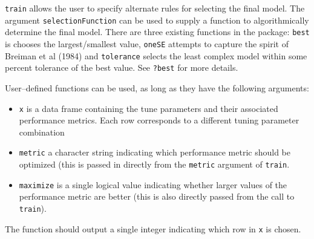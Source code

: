 \documentclass[12pt]{article}
\begin{document}
\texttt{train} allows the user to specify alternate rules for selecting the final model. The argument \texttt{selectionFunction}  can be used to supply a function to algorithmically determine the final model. There are three existing functions in the package: \texttt{best} is chooses the largest/smallest value, \texttt{oneSE} attempts to capture the spirit of Breiman et al (1984) and \texttt{tolerance} selects the least complex model within some percent tolerance of the best value. See \texttt{?best} for more details.

User--defined functions can be used, as long as they have the following arguments:
\begin{itemize}
  \item \texttt{x} is a data frame containing the tune parameters and their associated performance metrics. Each row corresponds to a different tuning parameter combination
    \item \texttt{metric} a character string indicating which performance metric should be optimized (this is passed in directly from the \texttt{metric} argument of \texttt{train}. 
      \item \texttt{maximize} is a single logical value indicating whether larger values of the performance metric are better (this is also directly passed from the call to \texttt{train}).
  \end{itemize}
  The function should output a single integer indicating which row in \texttt{x} is chosen.
\end{document}

